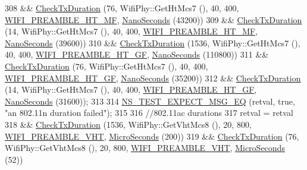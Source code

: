 \begin{DoxyCode}
308     && \hyperlink{classTxDurationTest_ac86b852957ecf1a1bed4f4e48debb30e}{CheckTxDuration} (76, WifiPhy::GetHtMcs7 (), 40, 400, 
      \hyperlink{group__wifi_gga5e94a56cb338a14ffbbb19c6a41251ebae0944a664debb28943c12d4cd7a81d2a}{WIFI\_PREAMBLE\_HT\_MF}, \hyperlink{group__timecivil_ga281d64bcb4dad96267d83c7688ec433f}{NanoSeconds} (43200))
309     && \hyperlink{classTxDurationTest_ac86b852957ecf1a1bed4f4e48debb30e}{CheckTxDuration} (14, WifiPhy::GetHtMcs7 (), 40, 400, 
      \hyperlink{group__wifi_gga5e94a56cb338a14ffbbb19c6a41251ebae0944a664debb28943c12d4cd7a81d2a}{WIFI\_PREAMBLE\_HT\_MF}, \hyperlink{group__timecivil_ga281d64bcb4dad96267d83c7688ec433f}{NanoSeconds} (39600))
310     && \hyperlink{classTxDurationTest_ac86b852957ecf1a1bed4f4e48debb30e}{CheckTxDuration} (1536, WifiPhy::GetHtMcs7 (), 40, 400, 
      \hyperlink{group__wifi_gga5e94a56cb338a14ffbbb19c6a41251eba82e0b00d79c1f01b7a6e46b693bafd72}{WIFI\_PREAMBLE\_HT\_GF}, \hyperlink{group__timecivil_ga281d64bcb4dad96267d83c7688ec433f}{NanoSeconds} (110800))
311     && \hyperlink{classTxDurationTest_ac86b852957ecf1a1bed4f4e48debb30e}{CheckTxDuration} (76, WifiPhy::GetHtMcs7 (), 40, 400, 
      \hyperlink{group__wifi_gga5e94a56cb338a14ffbbb19c6a41251eba82e0b00d79c1f01b7a6e46b693bafd72}{WIFI\_PREAMBLE\_HT\_GF}, \hyperlink{group__timecivil_ga281d64bcb4dad96267d83c7688ec433f}{NanoSeconds} (35200))
312     && \hyperlink{classTxDurationTest_ac86b852957ecf1a1bed4f4e48debb30e}{CheckTxDuration} (14, WifiPhy::GetHtMcs7 (), 40, 400, 
      \hyperlink{group__wifi_gga5e94a56cb338a14ffbbb19c6a41251eba82e0b00d79c1f01b7a6e46b693bafd72}{WIFI\_PREAMBLE\_HT\_GF}, \hyperlink{group__timecivil_ga281d64bcb4dad96267d83c7688ec433f}{NanoSeconds} (31600));
313 
314   \hyperlink{group__testing_ga7304ba46a28d8cf08dfdfd6499cf7068}{NS\_TEST\_EXPECT\_MSG\_EQ} (retval, \textcolor{keyword}{true}, \textcolor{stringliteral}{"an 802.11n duration failed"});
315 
316   \textcolor{comment}{//802.11ac durations}
317   retval = retval
318     && \hyperlink{classTxDurationTest_ac86b852957ecf1a1bed4f4e48debb30e}{CheckTxDuration} (1536, WifiPhy::GetVhtMcs8 (), 20, 800, 
      \hyperlink{group__wifi_gga5e94a56cb338a14ffbbb19c6a41251ebab90b0fe0b17f27e51c0fe16239e7b089}{WIFI\_PREAMBLE\_VHT}, \hyperlink{group__timecivil_ga17465a639c8d1464e76538afdd78a9f0}{MicroSeconds} (200))
319     && \hyperlink{classTxDurationTest_ac86b852957ecf1a1bed4f4e48debb30e}{CheckTxDuration} (76, WifiPhy::GetVhtMcs8 (), 20, 800, 
      \hyperlink{group__wifi_gga5e94a56cb338a14ffbbb19c6a41251ebab90b0fe0b17f27e51c0fe16239e7b089}{WIFI\_PREAMBLE\_VHT}, \hyperlink{group__timecivil_ga17465a639c8d1464e76538afdd78a9f0}{MicroSeconds} (52))

\end{DoxyCode}
